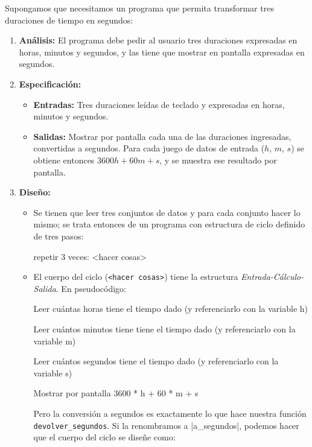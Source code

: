 Supongamos que necesitamos un programa que permita transformar tres duraciones
de tiempo en segundos:

\begin{enumerate}

\item {\bf Análisis: } El programa debe pedir al usuario tres duraciones
    expresadas en horas, minutos y segundos, y las tiene que mostrar en
    pantalla expresadas en segundos.

\item {\bf Especificación: }
\begin{itemize}
\item {\bf Entradas: } Tres duraciones leídas de teclado y expresadas en horas,
minutos y segundos.
\item {\bf Salidas: } Mostrar por pantalla cada una de las duraciones
    ingresadas, convertidas a segundos.  Para cada juego de datos de entrada
    ($h$, $m$, $s$) se obtiene entonces $3600 h + 60 m + s$, y se muestra
    ese resultado por pantalla.
\end{itemize}

\item {\bf Diseño:}
\begin{itemize}
\item Se tienen que leer tres conjuntos de datos y para cada conjunto hacer lo
mismo; se trata entonces de un programa con estructura de ciclo definido de
tres pasos:

\begin{codigo-nohl-sn}
repetir 3 veces:
    <hacer cosas>
\end{codigo-nohl-sn}

\item El cuerpo del ciclo (\verb+<hacer cosas>+) tiene la estructura {\it
Entrada-Cálculo-Salida}.  En pseudocódigo:

\begin{codigo-nohl-sn}
Leer cuántas horas tiene el tiempo dado
 (y referenciarlo con la variable h)

Leer cuántos minutos tiene tiene el tiempo dado
 (y referenciarlo con la variable m)

Leer cuántos segundos tiene el tiempo dado
 (y referenciarlo con la variable s)

Mostrar por pantalla 3600 * h + 60 * m + s
\end{codigo-nohl-sn}

Pero la conversión a segundos es exactamente lo que hace nuestra función
\verb+devolver_segundos+. Si la renombramos a |a_segundos|, podemos hacer que
el cuerpo del ciclo se diseñe como:


\end{itemize}
\end{enumerate}
